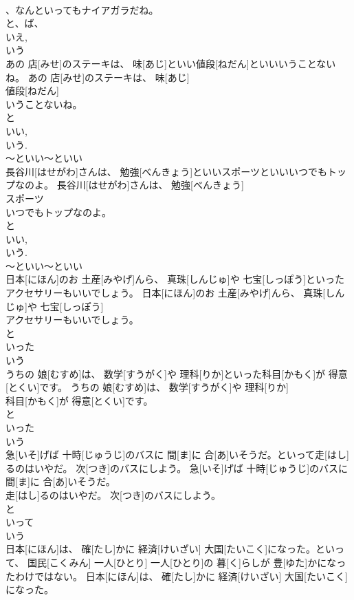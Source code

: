 \documentclass[8pt]{extreport}
\begin{document}
\begin{CJK}{UTF8}{min}
\\	、なんといってもナイアガラだね。	
\\	と、ば、
\\	いえ, 
\\	いう
\\	あの 店[みせ]のステーキは、 味[あじ]といい値段[ねだん]といいいうことないね。	あの 店[みせ]のステーキは、 味[あじ]
\\	値段[ねだん]
\\	いうことないね。	
\\	と 
\\	いい, 
\\	いう. 
\\	～といい～といい
\\	長谷川[はせがわ]さんは、 勉強[べんきょう]といいスポーツといいいつでもトップなのよ。	長谷川[はせがわ]さんは、 勉強[べんきょう]
\\	スポーツ
\\	いつでもトップなのよ。	
\\	と 
\\	いい, 
\\	いう. 
\\	～といい～といい
\\	日本[にほん]のお 土産[みやげ]んら、 真珠[しんじゅ]や 七宝[しっぽう]といったアクセサリーもいいでしょう。	日本[にほん]のお 土産[みやげ]んら、 真珠[しんじゅ]や 七宝[しっぽう]
\\	アクセサリーもいいでしょう。	
\\	と 
\\	いった 
\\	いう
\\	うちの 娘[むすめ]は、 数学[すうがく]や 理科[りか]といった科目[かもく]が 得意[とくい]です。	うちの 娘[むすめ]は、 数学[すうがく]や 理科[りか]
\\	科目[かもく]が 得意[とくい]です。	
\\	と 
\\	いった 
\\	いう
\\	急[いそ]げば 十時[じゅうじ]のバスに 間[ま]に 合[あ]いそうだ。といって走[はし]るのはいやだ。 次[つき]のバスにしよう。	急[いそ]げば 十時[じゅうじ]のバスに 間[ま]に 合[あ]いそうだ。
\\	走[はし]るのはいやだ。 次[つき]のバスにしよう。	
\\	と 
\\	いって 
\\	いう
\\	日本[にほん]は、 確[たし]かに 経済[けいざい] 大国[たいこく]になった。といって、 国民[こくみん] 一人[ひとり] 一人[ひとり]の 暮[く]らしが 豊[ゆた]かになったわけではない。	日本[にほん]は、 確[たし]かに 経済[けいざい] 大国[たいこく]になった。

\end{CJK}
\end{document}
